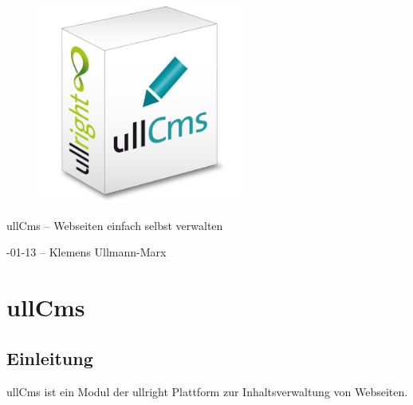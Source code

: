 \documentclass[article, a4paper, oneside, 11pt]{memoir}
\begin{document}
\vspace*{3cm}
\begin{figure}[htp]
\centering
\includegraphics[width=0.6\textwidth]{softwarebox}
\end{figure}

\vspace{1cm}

{%
\Large
\textbf
\centering
ullCms -- Webseiten einfach selbst verwalten
}

\vspace{1cm}

{%
\small
{}-01-13 -- Klemens Ullmann-Marx
}

\clearpage

\pagestyle{plain}

\setcounter{page}{1}

\setcounter{secnumdepth}{2}
\setcounter{tocdepth}{2}
\tableofcontents*

\clearpage

\addtocounter{chapter}{1}

\chapter*{ullCms}

\section{Einleitung}
ullCms ist ein Modul der ullright Plattform zur Inhaltsverwaltung von Webseiten. 
\end{document}
